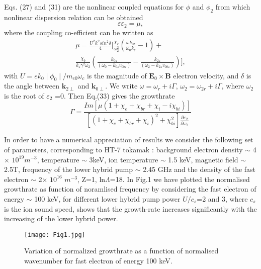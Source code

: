 \documentclass[aip,pop,amsmath,amssymb,showpacs,reprint,floatfix,lengthcheck]{revtex4-1}
\begin{document}
Eqs. (27) and (31) are the nonlinear coupled equations for $\phi$ and $\phi_{2}$ from which nonlinear dispersion relation can be obtained
\begin{equation}
 \varepsilon\varepsilon_{2}=\mu,
\end{equation}
where the coupling co-efficient can be written as
\begin{eqnarray}
\mu=\frac{U^2 k^2 sin^2\delta}{4}\biggl[\frac{\chi_{e}}{\omega_{2}^2}(\frac{\omega k_{0z}}{\omega_{0}k_{z}}-1)+\nonumber\\
\frac{\chi_{b}}{k_{z}{\gamma}^2\omega_{2}}(\frac{k_{0z}}{(\omega_{0}-k_{0z}v_{0bz})}-\frac{k_{2z}}{(\omega_{2}-k_{2z}v_{0bz})})\biggr],
\end{eqnarray}
with
 $U=ek_{0}\mid\phi_{0}\mid/m_{e0}\omega_{c}$ is the magnitude of $\textbf{E}_{0}\times \textbf{B}$ electron velocity, and $\delta$ is the angle between $\textbf{k}_{2\perp}$ and $\textbf{k}_{0\perp}$.
We write $\omega=\omega_{r}+i\Gamma$, $\omega_{2}=\omega_{2r}+i\Gamma$, where $\omega_{2}$ is the root of $\varepsilon_{2}$ =0. Then Eq.(33) gives the growthrate
\begin{equation}
 \Gamma=\frac{Im[\mu(1+\chi_{e}+\chi_{br}+\chi_{i}-i\chi_{bi})]}{[(1+\chi_{e}+\chi_{br}+\chi_{i})^2+\chi_{bi}^2]\frac{\partial\varepsilon_{2}}{\partial\omega_{2}}}
\end{equation}

 In order to have a numerical appreciation of results we consider the following set of parameters, corresponding to HT-7 tokamak \cite{chen2006dynamics} : background electron density $\sim$ 4$\times$ $10^{19} m^{-3}$, temperature $\sim$ 3keV, ion temperature $\sim$ 1.5 keV, magnetic field $\sim$ 2.5T, frequency of the lower hybrid pump $\sim$ 2.45 GHz and the density of the fast electron $\sim$ 2$\times$ $10^{16}$ $m^{-3}$, Z=1, ln$\Lambda$=18. 
 In Fig.1 we have plotted the normalised growthrate as function of noramlised frequency by considering the fast electron of energy $\sim$ 100 keV, for different lower hybrid pump power $U/c_{s}$=2 and 3, where $c_{s}$ is the ion sound speed, shows that the growth-rate increases significantly with the increasing of the lower hybrid power. 
 
 
\begin{figure}
\centering
\texttt{[image: Fig1.jpg]}
\caption{\label{fig:epsart} Variation of normalized growthrate as a function of normalised wavenumber for fast electron of energy 100 keV.}
\end{figure}
\end{document}
